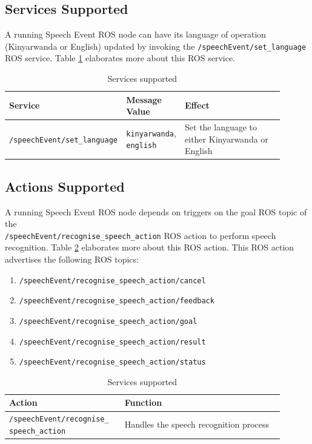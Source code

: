 \documentclass{CSSRforAfrica}
\begin{document}
\subsection{Services Supported}

A running Speech Event ROS node can have its language of operation (Kinyarwanda or English) updated by invoking the \texttt{/speechEvent/set\_language} ROS service. Table \ref{table:services} elaborates more about this ROS service.

\begin{center}
\begin{table}[thb]
\begin{tabular}[thb]{|p{0.36\linewidth}|p{0.18\linewidth}|p{0.36\linewidth}|} \hline
\rowcolor{lightgray} Service & Message Value & Effect \\ \hline
\texttt{/speechEvent/set\_language} & \texttt{kinyarwanda}, \texttt{english} & Set the language to either Kinyarwanda or English \\ \hline
\end{tabular}
\caption{Services supported}
\label{table:services}
\end{table}
\end{center}

\newpage
\subsection{Actions Supported}

A running Speech Event ROS node depends on triggers on the goal ROS topic of the \\\texttt{/speechEvent/recognise\_speech\_action} ROS action to perform speech recognition. Table \ref{table:actions} elaborates more about this ROS action. This ROS action advertises the following ROS topics:

\begin{enumerate}
    \item \texttt{/speechEvent/recognise\_speech\_action/cancel}
    \item \texttt{/speechEvent/recognise\_speech\_action/feedback}
    \item \texttt{/speechEvent/recognise\_speech\_action/goal}
    \item \texttt{/speechEvent/recognise\_speech\_action/result}
    \item \texttt{/speechEvent/recognise\_speech\_action/status}
\end{enumerate}

\begin{center}
\begin{table}[thb]
\begin{tabular}[thb]{|p{0.36\linewidth}|p{0.54\linewidth}|} \hline
\rowcolor{lightgray} Action & Function \\ \hline
\texttt{/speechEvent/recognise\_ speech\_action} & Handles the speech recognition process \\ \hline
\end{tabular}
\caption{Services supported}
\label{table:actions}
\end{table}
\end{center}
\end{document}
